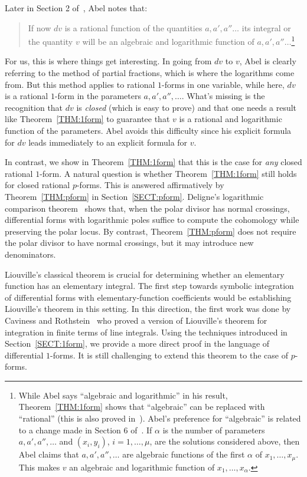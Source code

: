 \documentclass{amsart}
\theoremstyle{definition}
\numberwithin{equation}{section}
\numberwithin{thm}{section}
\begin{document}
Later in Section 2 of~\cite{Abel1}, Abel notes that:
\begin{quote}
	If now $dv$ is a rational function of the quantities $a, a', a''\dots$ its integral or the quantity $v$ will be an algebraic and logarithmic function of $a, a', a''\dots$\footnote{While Abel says ``algebraic and logarithmic'' in his result, Theorem~\ref{THM:1form} shows that ``algebraic'' can be replaced with ``rational'' (this is also proved in~\cite{Cox2024}). Abel's preference for ``algebraic'' is related to a change made in Section 6 of~\cite{Abel1}.  If $\alpha$ is the number of parameters $a,a',a'',\dots$ and $(x_i,y_i)$, $i =1,\dots,\mu$, are the solutions considered above, then Abel claims that $a,a',a'',\dots$ are algebraic functions of the first $\alpha$ of $x_1,\dots,x_\mu$.  This makes $v$ an algebraic and logarithmic function of $x_1,\dots,x_\alpha$.}
\end{quote}
For us, this is where things get interesting. In going from $dv$ to $v$, Abel is clearly referring to the method of partial fractions, which is where the logarithms come from.  But this method applies to rational $1$-forms in one variable, while here, $dv$ is a rational $1$-form in the parameters $a, a', a'',\dots$.  What's missing is the recognition that $dv$ is \textit{closed} (which is easy to prove) and that one needs a result like Theorem~\ref{THM:1form} to guarantee that $v$ is a rational and logarithmic function of the parameters.  Abel avoids this difficulty since his explicit formula for $dv$ leads immediately to an explicit formula for $v$.

In contrast, we show in Theorem~\ref{THM:1form} that this is the case for \textit{any} closed rational $1$-form.  A natural question is whether Theorem~\ref{THM:1form} still holds for closed rational $p$-forms. This is answered affirmatively by Theorem~\ref{THM:pform} in Section~\ref{SECT:pform}.
Deligne's logarithmic comparison theorem~\cite[Prop.~3.1.8]{Deligne1971} shows that, when the polar divisor has normal crossings, differential forms with logarithmic poles suffice to compute the cohomology while preserving the polar locus. By contrast, Theorem~\ref{THM:pform} does not require the polar divisor to have normal crossings, but it may introduce new denominators.

Liouville's  classical theorem is crucial for determining whether an elementary function has an elementary integral. The first step towards symbolic integration of differential forms with elementary-function coefficients would be establishing Liouville's theorem in this setting. In this direction, the first work was done by Caviness and Rothstein~\cite{Caviness1975} who proved a version of Liouville's theorem for integration
in finite terms of line integrals. Using the techniques introduced in Section~\ref{SECT:1form}, we provide a more direct proof in the language of differential $1$-forms. It is still challenging to extend this theorem to the case of $p$-forms.
\end{document}
